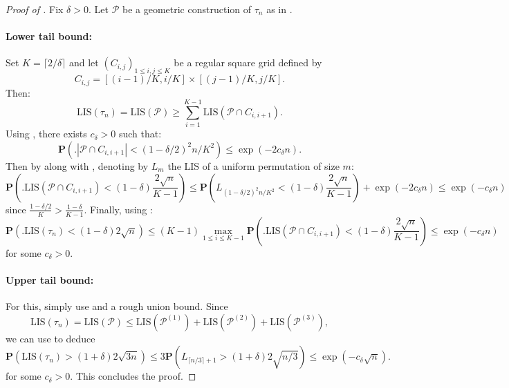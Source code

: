 \documentclass{article}
\theoremstyle{remark}
\def\m{\!-\!}
\def\p{\!+\!}
\newcommand{\card}[1]{\left|#1\right|}
\newcommand{\prob}[1]{\mathbf{P}\left(#1\right)}
\def\LIS{\mathrm{LIS}}
\def\pts{\mathcal{P}}
\begin{document}
\begin{proof}[Proof of ]
    Fix $\delta>0$.
    Let $\pts$ be a geometric construction of $\tau_n$ as in .
    
    \paragraph{Lower tail bound:}
    Set $K=\lceil 2/\delta \rceil$ and let $(C_{i,j})_{1\le i,j\le K}$ be a regular square grid defined by
    \begin{equation*}
        C_{i,j} = [(i\m1)/K,i/K]\times[(j\m1)/K,j/K] .
    \end{equation*}
    Then:
    \begin{equation}\label{eq: lower bound LIS}
        \LIS(\tau_n) = \LIS(\pts) \ge \sum_{i=1}^{K-1} \LIS(\pts\cap C_{i,i\p1}) .
    \end{equation}
    Using , there exists $c_\delta>0$ such that:
    \begin{equation*}
        \prob{\Big. \card{\pts\cap C_{i,i\p1}} < (1-\delta/2)^2 n/K^2}
        \le \exp\left({-2c_\delta n}\right) .
    \end{equation*}
    Then by \cite[Theorem~1]{DZ99} along with , denoting by $L_m$ the $\LIS$ of a uniform permutation of size $m$:
    \begin{equation*}
        \prob{\big.\LIS(\pts\cap C_{i,i\p1}) < (1-\delta)\frac{2\sqrt{n}}{K-1}}
        \le \prob{L_{(1-\delta/2)^2 n/K^2} < (1-\delta)\frac{2\sqrt{n}}{K-1}} + \exp\left(-2c_\delta n\right)
        \le \exp\left({-c_\delta n}\right) 
    \end{equation*}
    since $\frac{1-\delta/2}{K}>\frac{1-\delta}{K-1}$.
    Finally, using :
    \begin{equation*}
        \prob{\Big. \LIS(\tau_n) < (1-\delta)2\sqrt{n}}
        \le (K-1)\max_{1\le i\le K-1}\prob{\big.\LIS(\pts\cap C_{i,i\p1}) < (1-\delta)\frac{2\sqrt{n}}{K-1}}
        \le \exp\left({-c_\delta n}\right)
    \end{equation*}
    for some $c_\delta>0$.
    
    \paragraph{Upper tail bound:} For this, simply use  and a rough union bound.
    Since
    \begin{equation*}
        \LIS(\tau_n)=\LIS(\pts)\le \LIS(\pts^{(1)})+\LIS(\pts^{(2)})+\LIS(\pts^{(3)}) ,
    \end{equation*}
    we can use \cite[Theorem~2]{S98} to deduce
    \begin{equation*}
        \prob{\LIS(\tau_n) > (1+\delta)2\sqrt{3n}}
        \le 3\prob{L_{\lceil n/3\rceil+1} > (1+\delta)2\sqrt{n/3}}
        \le \exp\left(-c_\delta\sqrt{n}\right) .
    \end{equation*}
    for some $c_\delta>0$.
    This concludes the proof.
\end{proof}
\end{document}

